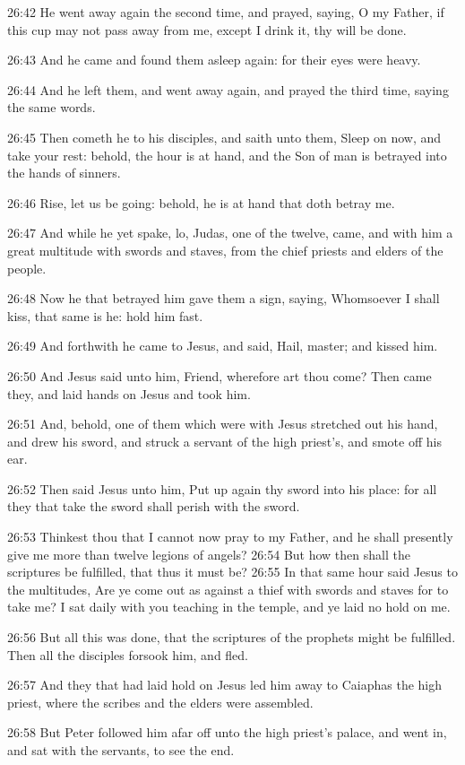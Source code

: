 26:42 He went away again the second time, and prayed, saying, O my
Father, if this cup may not pass away from me, except I drink it, thy
will be done.

26:43 And he came and found them asleep again: for their eyes were
heavy.

26:44 And he left them, and went away again, and prayed the third
time, saying the same words.

26:45 Then cometh he to his disciples, and saith unto them, Sleep on
now, and take your rest: behold, the hour is at hand, and the Son of
man is betrayed into the hands of sinners.

26:46 Rise, let us be going: behold, he is at hand that doth betray
me.

26:47 And while he yet spake, lo, Judas, one of the twelve, came, and
with him a great multitude with swords and staves, from the chief
priests and elders of the people.

26:48 Now he that betrayed him gave them a sign, saying, Whomsoever I
shall kiss, that same is he: hold him fast.

26:49 And forthwith he came to Jesus, and said, Hail, master; and
kissed him.

26:50 And Jesus said unto him, Friend, wherefore art thou come? Then
came they, and laid hands on Jesus and took him.

26:51 And, behold, one of them which were with Jesus stretched out his
hand, and drew his sword, and struck a servant of the high priest's,
and smote off his ear.

26:52 Then said Jesus unto him, Put up again thy sword into his place:
for all they that take the sword shall perish with the sword.

26:53 Thinkest thou that I cannot now pray to my Father, and he shall
presently give me more than twelve legions of angels?  26:54 But how
then shall the scriptures be fulfilled, that thus it must be?  26:55
In that same hour said Jesus to the multitudes, Are ye come out as
against a thief with swords and staves for to take me? I sat daily
with you teaching in the temple, and ye laid no hold on me.

26:56 But all this was done, that the scriptures of the prophets might
be fulfilled. Then all the disciples forsook him, and fled.

26:57 And they that had laid hold on Jesus led him away to Caiaphas
the high priest, where the scribes and the elders were assembled.

26:58 But Peter followed him afar off unto the high priest's palace,
and went in, and sat with the servants, to see the end.

